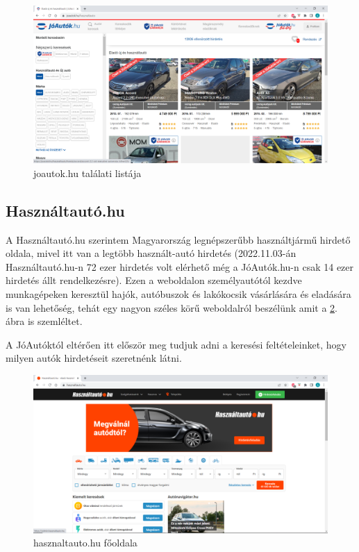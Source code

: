 \begin{figure}[h]
\centering
\includegraphics[scale=0.8]{images/joautok.png}
\caption{joautok.hu találati listája \cite{JoAuto}}
\label{fig:joautok}
\end{figure}

\subsection{Használtautó.hu}

A Használtautó.hu szerintem Magyarország legnépszerűbb használtjármű hirdető oldala, mivel itt van a legtöbb használt-autó hirdetés (2022.11.03-án Használtautó.hu-n 72 ezer hirdetés volt elérhető még a JóAutók.hu-n csak 14 ezer hirdetés állt rendelkezésre). Ezen a weboldalon személyautótól kezdve munkagépeken keresztül hajók, autóbuszok és lakókocsik vásárlására és eladására is van lehetőség, tehát egy nagyon széles körű weboldalról beszélünk amit a \ref{fig:hasznaltauto}. ábra is szemléltet.

A JóAutóktól eltérően itt először meg tudjuk adni a keresési feltételeinket, hogy milyen autók hirdetéseit szeretnénk látni.

\begin{figure}[h]
\centering
\includegraphics[scale=0.8]{images/hasznaltauto.png}
\caption{hasznaltauto.hu főoldala\cite{Hasznaltauto}}
\label{fig:hasznaltauto}
\end{figure}
\newpage


